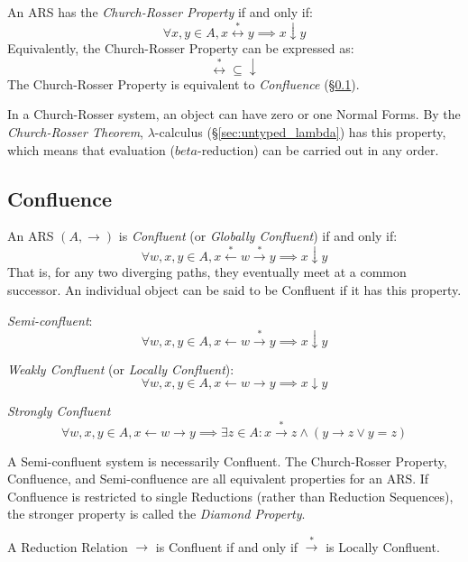 An ARS has the \emph{Church-Rosser Property} if and only if:
\[
    \forall x,y \in A, x \stackrel{*}\leftrightarrow y
    \implies x \downarrow y
\]
Equivalently, the Church-Rosser Property can be expressed as:
\[
    \stackrel{*}\leftrightarrow \subseteq \downarrow
\]
The Church-Rosser Property is equivalent to \emph{Confluence}
(\S\ref{sec:rewrite_confluence}).

In a Church-Rosser system, an object can have zero or one Normal
Forms. By the \emph{Church-Rosser Theorem}, $\lambda$-calculus
(\S\ref{sec:untyped_lambda}) has this property, which means that
evaluation ($beta$-reduction) can be carried out in any order.



\subsection{Confluence}\label{sec:rewrite_confluence}

An ARS $(A, \rightarrow)$ is \emph{Confluent} (or \emph{Globally
  Confluent}) if and only if:
\[
    \forall w,x,y \in A,
    x \stackrel{*}\leftarrow w \stackrel{*}\rightarrow y
    \implies x \downarrow y
\]
That is, for any two diverging paths, they eventually meet at a common
successor. An individual object can be said to be Confluent if it has
this property.

\emph{Semi-confluent}:
\[
    \forall w,x,y \in A,
    x \leftarrow w \stackrel{*}\rightarrow y
    \implies x \downarrow y
\]

\emph{Weakly Confluent} (or \emph{Locally Confluent}):
\[
    \forall w,x,y \in A,
    x \leftarrow w \rightarrow y \implies x \downarrow y
\]

\emph{Strongly Confluent}
\[
    \forall w,x,y \in A,
    x \leftarrow w \rightarrow y \implies
    \exists z \in A : x \stackrel{*}\rightarrow z \wedge
    (y \rightarrow z \vee y = z)
\]

A Semi-confluent system is necessarily Confluent. The Church-Rosser
Property, Confluence, and Semi-confluence are all equivalent
properties for an ARS. If Confluence is restricted to single
Reductions (rather than Reduction Sequences), the stronger property is
called the \emph{Diamond Property}.

A Reduction Relation $\rightarrow$ is Confluent if and only if
$\stackrel{*}\rightarrow$ is Locally Confluent.

